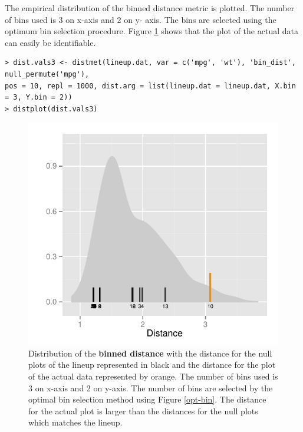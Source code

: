 \documentclass[article]{jss}
\begin{document}
\newpage

The empirical distribution of the binned distance metric is plotted. The number of bins used is 3 on x-axis and 2 on y- axis. The bins are selected using the optimum bin selection procedure. Figure \ref{dist-bin-2} shows that the plot of the actual data can easily be identifiable. 

\begin{verbatim}
> dist.vals3 <- distmet(lineup.dat, var = c('mpg', 'wt'), 'bin_dist', null_permute('mpg'), 
pos = 10, repl = 1000, dist.arg = list(lineup.dat = lineup.dat, X.bin = 3, Y.bin = 2))
> distplot(dist.vals3)
\end{verbatim}

\begin{figure}[hbtp]
\begin{center}
\includegraphics[scale=0.7]{nullabor-distr-bin-2.pdf}
\caption{Distribution of the \textbf{binned distance} with the distance for the null plots of the lineup represented in black and the distance for the plot of the actual data represented by orange. The number of bins used is 3 on x-axis and 2 on y-axis. The number of bins are selected by the optimal bin selection method using Figure \ref{opt-bin}. The distance for the actual plot is larger than the distances for the null plots which matches the lineup.}
\label{dist-bin-2}
\end{center}
\end{figure}

%

\end{document}
